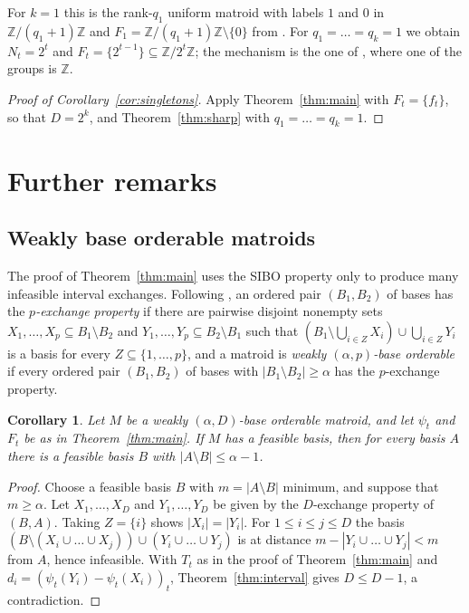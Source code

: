 \documentclass{amsart}
\newtheorem{corollary}[theorem]{Corollary}
\theoremstyle{definition}
\theoremstyle{remark}
\newcommand{\Z}{\mathbb{Z}}
\begin{document}
For $k=1$ this is the rank-$q_1$ uniform matroid with labels $1$ and $0$ in $\Z/(q_1+1)\Z$ and $F_1=\Z/(q_1+1)\Z\setminus\{0\}$ from \cite[Section~5]{HIMOS-full}. For $q_1=\dots=q_k=1$ we obtain $N_t=2^t$ and $F_t=\{2^{t-1}\}\subseteq\Z/2^t\Z$; the mechanism is the one of \cite[Example~5.1]{GMOSY}, where one of the groups is $\Z$.

\begin{proof}[Proof of Corollary~\ref{cor:singletons}]
Apply Theorem~\ref{thm:main} with $F_t=\{f_t\}$, so that $D=2^k$, and Theorem~\ref{thm:sharp} with $q_1=\dots=q_k=1$.
\end{proof}

\section{Further remarks}\label{sec:remarks}

\subsection{Weakly base orderable matroids}
The proof of Theorem~\ref{thm:main} uses the SIBO property only to produce many infeasible interval exchanges. Following \cite{HIMOS-full}, an ordered pair $(B_1,B_2)$ of bases has the \emph{$p$-exchange property} if there are pairwise disjoint nonempty sets $X_1,\dots,X_p\subseteq B_1\setminus B_2$ and $Y_1,\dots,Y_p\subseteq B_2\setminus B_1$ such that $(B_1\setminus\bigcup_{i\in Z}X_i)\cup\bigcup_{i\in Z}Y_i$ is a basis for every $Z\subseteq\{1,\dots,p\}$, and a matroid is \emph{weakly $(\alpha,p)$-base orderable} if every ordered pair $(B_1,B_2)$ of bases with $|B_1\setminus B_2|\ge\alpha$ has the $p$-exchange property.

\begin{corollary}\label{cor:weak}
Let $M$ be a weakly $(\alpha,D)$-base orderable matroid, and let $\psi_t$ and $F_t$ be as in Theorem~\ref{thm:main}. If $M$ has a feasible basis, then for every basis $A$ there is a feasible basis $B$ with $|A\setminus B|\le\alpha-1$.
\end{corollary}

\begin{proof}
Choose a feasible basis $B$ with $m=|A\setminus B|$ minimum, and suppose that $m\ge\alpha$. Let $X_1,\dots,X_D$ and $Y_1,\dots,Y_D$ be given by the $D$-exchange property of $(B,A)$. Taking $Z=\{i\}$ shows $|X_i|=|Y_i|$. For $1\le i\le j\le D$ the basis $(B\setminus(X_i\cup\dots\cup X_j))\cup(Y_i\cup\dots\cup Y_j)$ is at distance $m-|Y_i\cup\dots\cup Y_j|<m$ from $A$, hence infeasible. With $T_t$ as in the proof of Theorem~\ref{thm:main} and $d_i=(\psi_t(Y_i)-\psi_t(X_i))_t$, Theorem~\ref{thm:interval} gives $D\le D-1$, a contradiction.
\end{proof}
\end{document}

